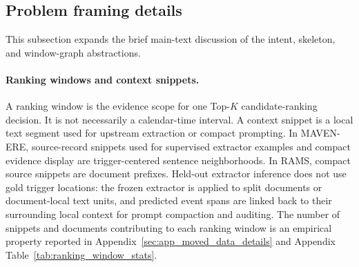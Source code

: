 \documentclass{article}
\begin{document}
\subsection{Problem framing details}
\label{sec:app_moved_intro_details}

This subsection expands the brief main-text discussion of the intent, skeleton, and window-graph abstractions.

\paragraph{Ranking windows and context snippets.}
A ranking window is the evidence scope for one Top-$K$ candidate-ranking decision.
It is not necessarily a calendar-time interval.
A context snippet is a local text segment used for upstream extraction or compact prompting.
In MAVEN-ERE, source-record snippets used for supervised extractor examples and compact evidence display are trigger-centered sentence neighborhoods.
In RAMS, compact source snippets are document prefixes.
Held-out extractor inference does not use gold trigger locations: the frozen extractor is applied to split documents or document-local text units, and predicted event spans are linked back to their surrounding local context for prompt compaction and auditing.
The number of snippets and documents contributing to each ranking window is an empirical property reported in Appendix~\ref{sec:app_moved_data_details} and Appendix Table~\ref{tab:ranking_window_stats}.
\end{document}
